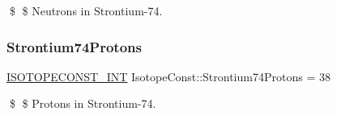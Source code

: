\$ \$ Neutrons in Strontium-\/74. \mbox{\label{group___isotope_const-_strontium-_sr74_gaf15496fc52e47fee8cc9006220ab3d6b}} 
\subsubsection{\texorpdfstring{Strontium74\+Protons}{Strontium74Protons}}
{\footnotesize\ttfamily \mbox{\hyperlink{group___isotope_const-_macros_ga5f18360b3e99483a35c32d789e62621c}{I\+S\+O\+T\+O\+P\+E\+C\+O\+N\+S\+T\+\_\+\+I\+NT}} Isotope\+Const\+::\+Strontium74\+Protons = 38}

\$ \$ Protons in Strontium-\/74. 